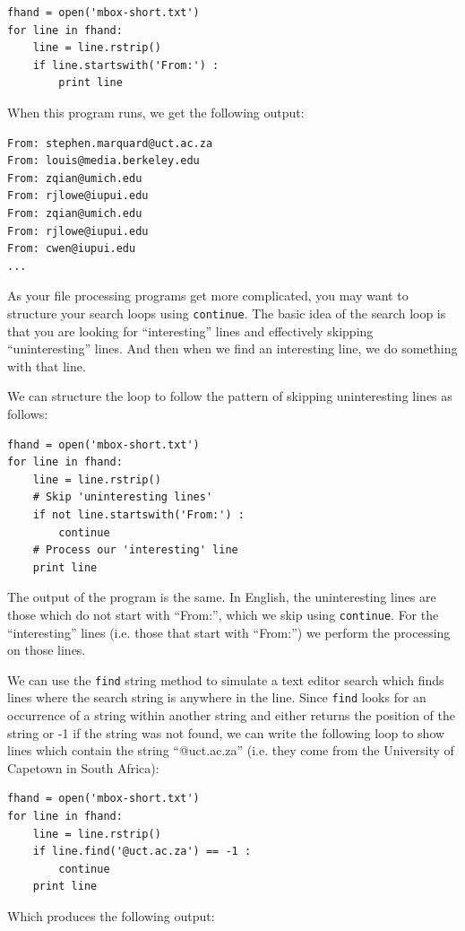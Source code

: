 \documentclass[10pt]{book}
\begin{document}
\beforeverb
\begin{verbatim}
fhand = open('mbox-short.txt')
for line in fhand:
    line = line.rstrip()
    if line.startswith('From:') :
        print line
\end{verbatim}
\afterverb
%
When this program runs, we get the following output:

\beforeverb
\begin{verbatim}
From: stephen.marquard@uct.ac.za
From: louis@media.berkeley.edu
From: zqian@umich.edu
From: rjlowe@iupui.edu
From: zqian@umich.edu
From: rjlowe@iupui.edu
From: cwen@iupui.edu
...
\end{verbatim}
\afterverb
%
As your file processing programs get more complicated, you may want 
to structure your search loops using {\tt continue}.  The basic idea 
of the search loop is that you are looking for ``interesting'' lines
and effectively skipping ``uninteresting'' lines.  And then when we
find an interesting line, we do something with that line.

We can structure the loop to follow the
pattern of skipping uninteresting lines as follows:

\beforeverb
\begin{verbatim}
fhand = open('mbox-short.txt')
for line in fhand:
    line = line.rstrip()
    # Skip 'uninteresting lines'
    if not line.startswith('From:') :
        continue
    # Process our 'interesting' line
    print line
\end{verbatim}
\afterverb
%
The output of the program is the same.  In English, the 
uninteresting lines are those which do not start 
with ``From:'', which we skip using {\tt continue}.
For the ``interesting'' lines (i.e. those that start with ``From:'')
we perform the processing on those lines.

We can use the {\tt find} string method to simulate a text editor
search which finds lines where the search string is anywhere in the line.  
Since {\tt find} looks for an occurrence of a string within another
string and either returns the position of the string or -1 if the string
was not found, we can write the following loop to show lines which
contain the string ``@uct.ac.za'' (i.e. they come from the University 
of Capetown in South Africa):

\beforeverb
\begin{verbatim}
fhand = open('mbox-short.txt')
for line in fhand:
    line = line.rstrip()
    if line.find('@uct.ac.za') == -1 : 
        continue
    print line
\end{verbatim}
\afterverb
%
Which produces the following output:
\end{document}
